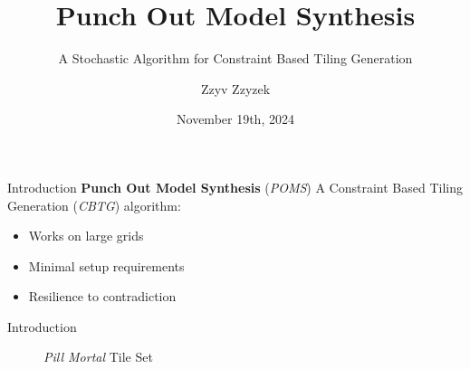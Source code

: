 \documentclass{beamer}
\title{Punch Out Model Synthesis}
\subtitle{A Stochastic Algorithm for Constraint Based Tiling Generation}
\date{November 19th, 2024}
\author{Zzyv Zzyzek}
\begin{document}
\newcommand{\specialcell}[2][c]{\begin{tabular}[#1]{@{}l@{}}#2\end{tabular}}
\newcommand{\specialcellCenter}[2][c]{\begin{tabular}[#1]{@{}c@{}}#2\end{tabular}}

  \maketitle



  \begin{frame}[fragile]{Introduction}
    \textbf{Punch Out Model Synthesis} (\textit{POMS})
    A Constraint Based Tiling Generation (\textit{CBTG}) algorithm:
    \begin{itemize}
      \item Works on large grids
      \item Minimal setup requirements
      \item Resilience to contradiction
    \end{itemize}
  \end{frame}

  \begin{frame}[fragile]{Introduction}
    \begin{figure}
      \textit{Pill Mortal} Tile Set

    \end{figure}
  \end{frame}

\end{document}

